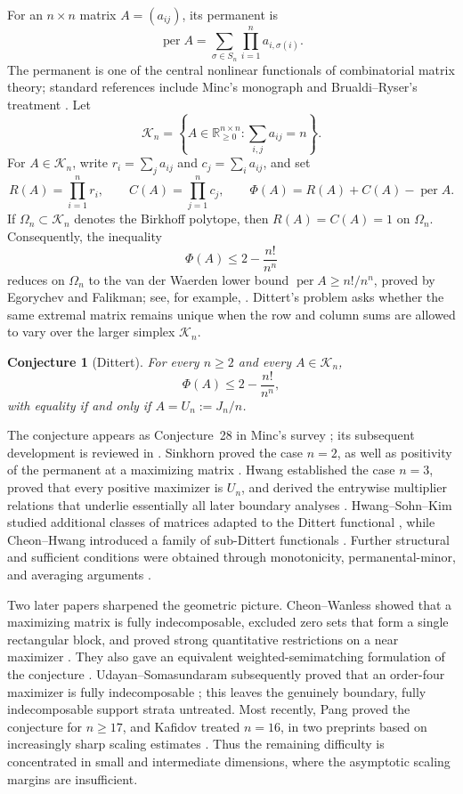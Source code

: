 \documentclass[10pt,a4paper]{amsart}
\newtheorem{conjecture}[theorem]{Conjecture}
\theoremstyle{definition}
\theoremstyle{remark}
\begin{document}
For an \(n\times n\) matrix \(A=(a_{ij})\), its permanent is
\[
 \operatorname{per}A=\sum_{\sigma\in S_n}
 \prod_{i=1}^n a_{i,\sigma(i)}.
\]
The permanent is one of the central nonlinear functionals of
combinatorial matrix theory; standard references include
Minc's monograph and Brualdi--Ryser's treatment
\cite{Minc78,BrualdiRyser}.  Let
\[
 \mathcal K_n=\left\{A\in\mathbb R_{\geq0}^{n\times n}:
       \sum_{i,j}a_{ij}=n\right\}.
\]
For \(A\in\mathcal K_n\), write \(r_i=\sum_j a_{ij}\) and
\(c_j=\sum_i a_{ij}\), and set
\[
 R(A)=\prod_{i=1}^n r_i,\qquad
 C(A)=\prod_{j=1}^n c_j,\qquad
 \Phi(A)=R(A)+C(A)-\operatorname{per}A.
\]
If \(\Omega_n\subset\mathcal K_n\) denotes the Birkhoff polytope, then
\(R(A)=C(A)=1\) on \(\Omega_n\).  Consequently, the inequality
\[
 \Phi(A)\leq 2-\frac{n!}{n^n}
\]
reduces on \(\Omega_n\) to the van der Waerden lower bound
\(\operatorname{per}A\geq n!/n^n\), proved by
Egorychev and Falikman; see, for example, \cite{Egorychev,Minc78}.
Dittert's problem asks whether the same extremal matrix remains unique
when the row and column sums are allowed to vary over the larger simplex
\(\mathcal K_n\).

\begin{conjecture}[Dittert]\label{conj:dittert}
For every \(n\geq2\) and every \(A\in\mathcal K_n\),
\[
 \Phi(A)\leq 2-\frac{n!}{n^n},
\]
with equality if and only if \(A=U_n:=J_n/n\).
\end{conjecture}

The conjecture appears as Conjecture~28 in Minc's survey
\cite{Minc83}; its subsequent development is reviewed in
\cite{CW05}.  Sinkhorn proved the case \(n=2\), as well as positivity of
the permanent at a maximizing matrix \cite{Sinkhorn}.  Hwang established
the case \(n=3\), proved that every positive maximizer is \(U_n\), and
derived the entrywise multiplier relations that underlie essentially all
later boundary analyses \cite{HwangDittert,Hwang87}.  Hwang--Sohn--Kim
studied additional classes of matrices adapted to the Dittert functional
\cite{HSK90}, while Cheon--Hwang introduced a family of sub-Dittert
functionals \cite{CH92}.  Further structural and sufficient conditions
were obtained through monotonicity, permanental-minor, and averaging
arguments \cite{Cheon93,CY}.

Two later papers sharpened the geometric picture.  Cheon--Wanless showed
that a maximizing matrix is fully indecomposable, excluded zero sets that
form a single rectangular block, and proved strong quantitative
restrictions on a near maximizer \cite{CW}.  They also gave an equivalent
weighted-semimatching formulation of the conjecture
\cite{CW07}.  Udayan--Somasundaram subsequently proved that an order-four
maximizer is fully indecomposable \cite{US24}; this leaves the genuinely
boundary, fully indecomposable support strata untreated.  Most recently,
Pang proved the conjecture for \(n\geq17\), and Kafidov treated
\(n=16\), in two preprints based on increasingly sharp scaling estimates
\cite{Pang,Kafidov}.  Thus the remaining difficulty is concentrated in
small and intermediate dimensions, where the asymptotic scaling margins
are insufficient.
\end{document}
